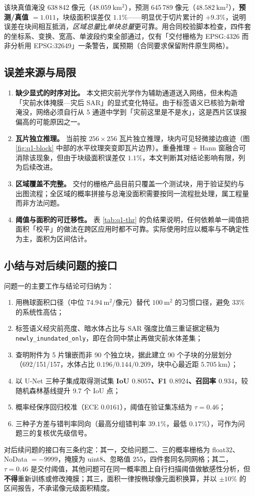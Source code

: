 该块真值淹没 638\,842 像元（$48.059\ \mathrm{km^2}$），预测 645\,789 像元（$48.582\ \mathrm{km^2}$），\textbf{预测/真值 $=1.011$}，块级面积误差仅 $1.1\%$——明显优于切片累计的 $+9.3\%$，说明误差在块间相互抵消，\emph{区域总量}比\emph{单块总量}更可靠。用合同校验脚本检查，四件套的坐标系、变换、宽高、单波段约束全部通过，仅有「交付栅格为 EPSG:4326 而非分析用 EPSG:32649」一条警告，属预期（合同要求保留附件原生网格）。

\subsection{误差来源与局限}
\label{sec:q1-limit}

\begin{enumerate}
\item \textbf{缺少显式的时序对比。} 本文把灾前光学作为辅助通道送入网络，但未构造「灾前水体掩膜—灾后 SAR」的显式变化特征。由于标签语义已核验为新增淹没，网络必须自行从 5 通道中学到「灾前这里是不是水」，这是西片区误报偏高的可能原因之一。
\item \textbf{瓦片独立推理。} 当前按 $256\times256$ 瓦片独立推理，块内可见轻微接边痕迹（图 \ref{fig:q1-block} 中部的水平纹理突变即瓦片边界）。重叠推理 + Hann 窗融合可消除该现象，但由于块级面积误差仅 $1.1\%$，本文判断其对结论影响有限，列为后续改进。
\item \textbf{区域覆盖不完整。} 交付的栅格产品目前只覆盖一个测试块，用于验证契约与出图流程；全区域的概率拼接与总淹没面积需要按同一流程批处理，属工程量而非方法问题。
\item \textbf{阈值与面积的可迁移性。} 表 \ref{tab:q1-thr} 的负结果说明，任何依赖单一阈值把面积「校平」的做法在跨区应用时都不可靠。实际使用时应以概率与不确定性为主，面积为区间估计。
\end{enumerate}

\subsection{小结与对后续问题的接口}
\label{sec:q1-summary}

问题一的主要工作与结论可归纳为：

\begin{enumerate}
\item 用椭球面积口径（中位 $74.94\ \mathrm{m^2}$/像元）替代 $100\ \mathrm{m^2}$ 的习惯口径，避免 $33\%$ 的系统性高估；
\item 标签语义经灾前亮度、暗水体占比与 SAR 强度比值三重证据定稿为 \mbox{\texttt{newly\_inundated\_only}}，即在合同中禁止再做灾前水体差集；
\item 查明附件为 5 片镶嵌而非 90 个独立块，据此建立 90 个子块的分层划分（692/151/157，水体占比 $0.196/0.144/0.209$，块中心最近距 $5.705\ \mathrm{km}$）；
\item 以 U-Net 三种子集成取得测试集 \textbf{IoU $0.8057$、F1 $0.8924$、召回率 $0.934$}，较随机森林基线提升 9.7 个 IoU 点；
\item 概率经保序回归校准（ECE $0.0161$），阈值在验证集冻结为 $\tau=0.46$；
\item 三种子方差与错判率同向（最高分组错判率 $39.1\%$，最低 $0.17\%$），可作为问题三的复核优先级信号。
\end{enumerate}

对后续问题的接口有三条约定：其一，交给问题二、三的概率栅格为 float32、NoData $=-9999$，掩膜为 uint8、忽略值 $255$，四件套同名同网格；其二，$\tau=0.46$ 是交付阈值，其他问题可在同一概率图上自行扫描阈值做敏感性分析，但\textbf{不得}重新训练或修改掩膜；其三，面积一律按椭球像元面积换算，并以 $\pm10\%$ 的区间报告，不承诺像元级面积精度。